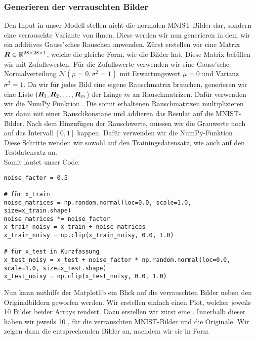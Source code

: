 \subsubsection{Generieren der verrauschten Bilder}
Den Input in unser Modell stellen nicht die normalen MNIST-Bilder dar, sondern
eine verrauschte Variante von ihnen. Diese werden wir nun generieren in dem wir
ein additives Gauss'sches Rauschen anwenden.
\para{}
Zürst erstellen wir eine Matrix $\bm{R} \in \mathbb{R}^{28 \times 28 \times 1}$, welche die gleiche Form, wie die
Bilder hat. Diese Matrix befüllen wir mit Zufallswerten. Für die
Zufallswerte verwenden wir eine Gauss'sche Normalverteilung
$\mathcal{N}(\mu = 0, \sigma^2 = 1)$ mit Erwartungswert $\mu = 0$ und Varianz
$\sigma^2 = 1$. Da wir für jedes Bild eine eigene Rauschmatrix brauchen,
generieren wir eine Liste $(\bm{R}_1,\bm{R}_2,\ldots,\bm{R}_m$) der Länge $m$ an
Rauschmatrizen. Dafür verwenden wir die NumPy Funktion
.
Die somit erhaltenen Rauschmatrizen multiplizieren wir dann mit einer
Rauschkonstane  und addieren das Resulat auf die MNIST-Bilder.
Nach dem Hinzufügen der Rauschwerte, müssen wir die Grauwerte noch auf das Intervall
$[0,1]$ kappen. Dafür verwenden wir die NumPy-Funktion . Diese Schritte wenden
wir sowohl auf den Trainingsdatensatz, wie auch auf den Testdatensatz an. \\
Somit lautet unser Code:
\begin{verbatim}
noise_factor = 0.5

# für x_train
noise_matrices = np.random.normal(loc=0.0, scale=1.0, size=x_train.shape)
noise_matrices *= noise_factor
x_train_noisy = x_train + noise_matrices
x_train_noisy = np.clip(x_train_noisy, 0.0, 1.0)

# für x_test in Kurzfassung
x_test_noisy = x_test + noise_factor * np.random.normal(loc=0.0, scale=1.0, size=x_test.shape)
x_test_noisy = np.clip(x_test_noisy, 0.0, 1.0)
\end{verbatim}
\para{}
Nun kann mithilfe der Matplotlib ein Blick auf die verrauschten Bilder
neben den Originalbildern geworfen werden. Wir erstellen einfach einen Plot, welcher
jeweils 10 Bilder beider Arrays rendert. \para{}
Dazu erstellen wir zürst eine . Innerhalb dieser haben wir
jeweils 10 , für die verrauschten MNIST-Bilder und die
Originale. Wir zeigen dann die entsprechenden Bilder an, nachdem wir sie in Form
